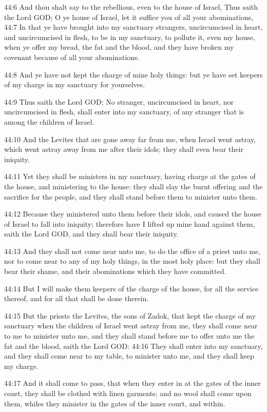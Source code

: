44:6 And thou shalt say to the rebellious, even to the house of
Israel, Thus saith the Lord GOD; O ye house of Israel, let it suffice
you of all your abominations, 44:7 In that ye have brought into my
sanctuary strangers, uncircumcised in heart, and uncircumcised in
flesh, to be in my sanctuary, to pollute it, even my house, when ye
offer my bread, the fat and the blood, and they have broken my
covenant because of all your abominations.

44:8 And ye have not kept the charge of mine holy things: but ye have
set keepers of my charge in my sanctuary for yourselves.

44:9 Thus saith the Lord GOD; No stranger, uncircumcised in heart, nor
uncircumcised in flesh, shall enter into my sanctuary, of any stranger
that is among the children of Israel.

44:10 And the Levites that are gone away far from me, when Israel went
astray, which went astray away from me after their idols; they shall
even bear their iniquity.

44:11 Yet they shall be ministers in my sanctuary, having charge at
the gates of the house, and ministering to the house: they shall slay
the burnt offering and the sacrifice for the people, and they shall
stand before them to minister unto them.

44:12 Because they ministered unto them before their idols, and caused
the house of Israel to fall into iniquity; therefore have I lifted up
mine hand against them, saith the Lord GOD, and they shall bear their
iniquity.

44:13 And they shall not come near unto me, to do the office of a
priest unto me, nor to come near to any of my holy things, in the most
holy place: but they shall bear their shame, and their abominations
which they have committed.

44:14 But I will make them keepers of the charge of the house, for all
the service thereof, and for all that shall be done therein.

44:15 But the priests the Levites, the sons of Zadok, that kept the
charge of my sanctuary when the children of Israel went astray from
me, they shall come near to me to minister unto me, and they shall
stand before me to offer unto me the fat and the blood, saith the Lord
GOD: 44:16 They shall enter into my sanctuary, and they shall come
near to my table, to minister unto me, and they shall keep my charge.

44:17 And it shall come to pass, that when they enter in at the gates
of the inner court, they shall be clothed with linen garments; and no
wool shall come upon them, whiles they minister in the gates of the
inner court, and within.

